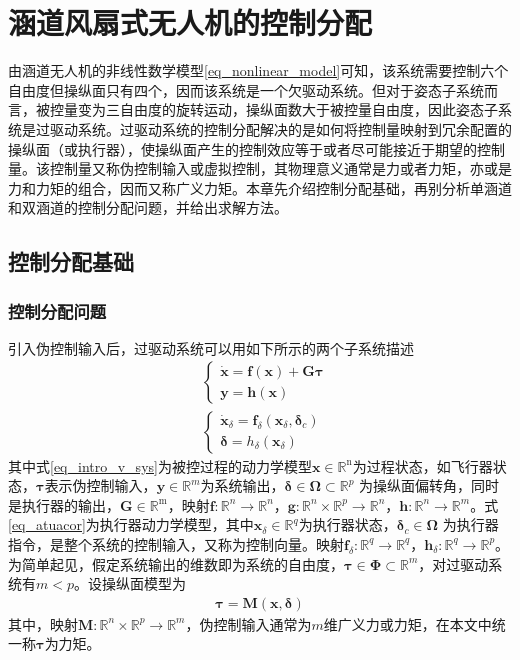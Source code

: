 \chapter{涵道风扇式无人机的控制分配}
由涵道无人机的非线性数学模型\eqref{eq_nonlinear_model}可知，该系统需要控制六个自由度但操纵面只有四个，因而该系统是一个欠驱动系统。但对于姿态子系统而言，被控量变为三自由度的旋转运动，操纵面数大于被控量自由度，因此姿态子系统是过驱动系统。过驱动系统的控制分配解决的是如何将控制量映射到冗余配置的操纵面（或执行器），使操纵面产生的控制效应等于或者尽可能接近于期望的控制量。该控制量又称伪控制输入或虚拟控制，其物理意义通常是力或者力矩，亦或是力和力矩的组合，因而又称广义力矩。本章先介绍控制分配基础，再别分析单涵道和双涵道的控制分配问题，并给出求解方法。
\section{控制分配基础}
%
\subsection{控制分配问题}
%
引入伪控制输入后，过驱动系统可以用如下所示的两个子系统描述
\begin{align}
&\left\{\begin{array}{l}
\dot{\bm{x}}= \bm{f}\left( \bm{x} \right) + \bm{G} \bm{\tau} \\
\bm{y} = \bm{h}\left( \bm{x} \right)
\end{array}\right. \label{eq_intro_v_sys}	\\
&\left\{\begin{array}{l}
\dot{\bm{x}}_{\delta}  = \bm{f}_{\delta} \left( \bm{x}_{\delta},\bm{\delta}_c \right)  \\
\bm{\delta}=h_{\delta}\left( \bm{x}_{\delta} \right) 
\end{array}\right. \label{eq_atuacor}
\end{align}
其中式\eqref{eq_intro_v_sys}为被控过程的动力学模型$\bm{x}\in {\mathbb{R}}^{\text{n}}$为过程状态，如飞行器状态，$\bm{\tau}$表示伪控制输入，$\bm{y} \in \mathbb{R}^{m}$为系统输出，${\bm{\delta}}\in{\bm{\Omega}}\subset\mathbb{R}^{p}$ 为操纵面偏转角，同时是执行器的输出，$\bm{G}\in {\mathbb{R}}^{\text{m}}$，映射$\bm{f}: \mathbb{R}^{n} \rightarrow \mathbb{R}^{n}$，$\bm{g}: \mathbb{R}^{n} \times \mathbb{R}^{p} \rightarrow \mathbb{R}^{n}$，$\bm{h}: \mathbb{R}^{n} \rightarrow \mathbb{R}^{m}$。式\eqref{eq_atuacor}为执行器动力学模型，其中$\bm{x}_{\delta} \in \mathbb{R}^{q} $为执行器状态，${\bm{\delta}_c} \in {\bm{\Omega}}$ 为执行器指令，是整个系统的控制输入，又称为控制向量。映射$\bm{f}_{\delta}: \mathbb{R}^{q} \rightarrow \mathbb{R}^{q}$，$\bm{h}_{\delta}: \mathbb{R}^{q} \rightarrow \mathbb{R}^{p}$。为简单起见，假定系统输出的维数即为系统的自由度，$\bm{\tau}\in \bm{\Phi} \subset \mathbb{R}^{m}$，对过驱动系统有$m<p$。设操纵面模型为
\begin{align}
\bm{\tau} =\bm{M}(\bm{x}, \bm{\delta})  \label{eq_effetor_model}
\end{align}
其中，映射$\bm{M}: \mathbb{R}^{n} \times \mathbb{R}^{p} \rightarrow \mathbb{R}^{m}$，伪控制输入通常为$m$维广义力或力矩，在本文中统一称$\bm{\tau}$为力矩。


